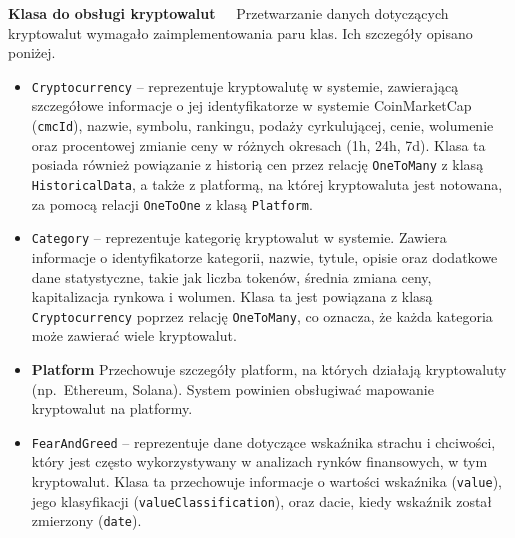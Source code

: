 \noindent \textbf{Klasa do obsługi kryptowalut~~}
Przetwarzanie danych dotyczących kryptowalut wymagało zaimplementowania paru klas. Ich szczegóły opisano poniżej.
\begin{itemize}
	\item \texttt{Cryptocurrency} -- reprezentuje kryptowalutę w systemie, zawierającą szczegółowe informacje o jej identyfikatorze w systemie CoinMarketCap (\texttt{cmcId}), nazwie, symbolu, rankingu, podaży cyrkulującej, cenie, wolumenie oraz procentowej zmianie ceny w różnych okresach (1h, 24h, 7d). Klasa ta posiada również powiązanie z historią cen przez relację \texttt{OneToMany} z klasą \texttt{HistoricalData}, a także z platformą, na której kryptowaluta jest notowana, za pomocą relacji \texttt{OneToOne} z klasą \texttt{Platform}.
	\item \texttt{Category} -- reprezentuje kategorię kryptowalut w systemie. Zawiera informacje o identyfikatorze kategorii, nazwie, tytule, opisie oraz dodatkowe dane statystyczne, takie jak liczba tokenów, średnia zmiana ceny, kapitalizacja rynkowa i wolumen. Klasa ta jest powiązana z klasą \texttt{Cryptocurrency} poprzez relację \texttt{OneToMany}, co oznacza, że każda kategoria może zawierać wiele kryptowalut. 
	\item \textbf{Platform} Przechowuje szczegóły platform, na których działają kryptowaluty (np.\ Ethereum, Solana). System powinien obsługiwać mapowanie kryptowalut na platformy.
	\item \texttt{FearAndGreed} -- reprezentuje dane dotyczące wskaźnika strachu i chciwości, który jest często wykorzystywany w analizach rynków finansowych, w tym kryptowalut. Klasa ta przechowuje informacje o wartości wskaźnika (\texttt{value}), jego klasyfikacji (\texttt{valueClassification}), oraz dacie, kiedy wskaźnik został zmierzony (\texttt{date}).
\end{itemize}

